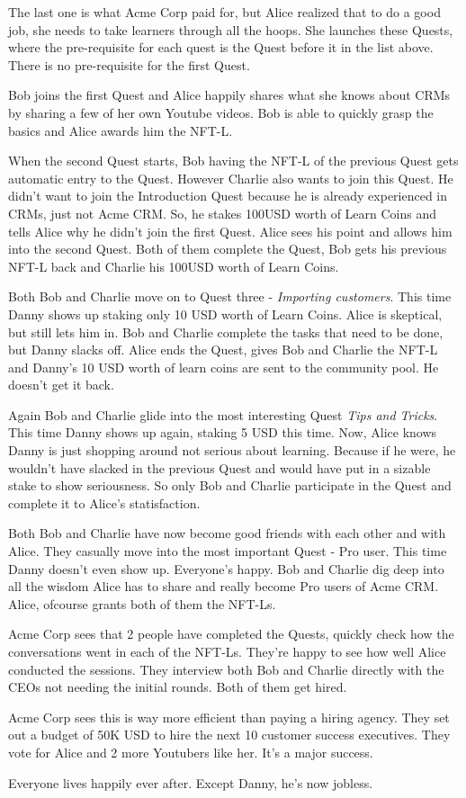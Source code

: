\documentclass{article}
\begin{document}
    The last one is what Acme Corp paid for, but Alice realized that to do a good job, she needs to take learners through all the hoops. She launches these Quests, where the pre-requisite for each quest is the Quest before it in the list above.
    There is no pre-requisite for the first Quest.
    \par
    Bob joins the first Quest and Alice happily shares what she knows about CRMs by sharing a few of her own Youtube videos. Bob is able to quickly grasp the basics and Alice awards him the NFT-L.
    \par
    When the second Quest starts, Bob having the NFT-L of the previous Quest gets automatic entry to the Quest.
    However Charlie also wants to join this Quest. He didn't want to join the Introduction Quest because he is already experienced in CRMs, just not Acme CRM.
    So, he stakes 100USD worth of Learn Coins and tells Alice why he didn't join the first Quest. Alice sees his point and allows him into the second Quest. 
    Both of them complete the Quest, Bob gets his previous NFT-L back and Charlie his 100USD worth of Learn Coins.
    \par
    Both Bob and Charlie move on to Quest three - \textit{Importing customers}. This time Danny shows up staking only 10 USD worth of Learn Coins. Alice is skeptical, but still lets him in.
    Bob and Charlie complete the tasks that need to be done, but Danny slacks off. Alice ends the Quest, gives Bob and Charlie the NFT-L and Danny's 10 USD worth of learn coins are sent to the community pool. He doesn't get it back. 
    \par
    Again Bob and Charlie glide into the most interesting Quest \textit{Tips and Tricks}. This time Danny shows up again, staking 5 USD this time. 
    Now, Alice knows Danny is just shopping around not serious about learning. Because if he were, he wouldn't have slacked in the previous Quest and would have put in a sizable stake to show seriousness.
    So only Bob and Charlie participate in the Quest and complete it to Alice's statisfaction. 
    \par 
    Both Bob and Charlie have now become good friends with each other and with Alice. They casually move into the most important Quest - Pro user. 
    This time Danny doesn't even show up. Everyone's happy. Bob and Charlie dig deep into all the wisdom Alice has to share and really become Pro users of Acme CRM. Alice, ofcourse grants both of them the NFT-Ls.
    \par
    Acme Corp sees that 2 people have completed the Quests, quickly check how the conversations went in each of the NFT-Ls. They're happy to see how well Alice conducted the sessions. 
    They interview both Bob and Charlie directly with the CEOs not needing the initial rounds. Both of them get hired.
    \par
    Acme Corp sees this is way more efficient than paying a hiring agency. They set out a budget of 50K USD to hire the next 10 customer success executives. They vote for Alice and 2 more Youtubers like her.
    It's a major success.
    \par
    Everyone lives happily ever after. Except Danny, he's now jobless.

      
        

      
\end{document}
